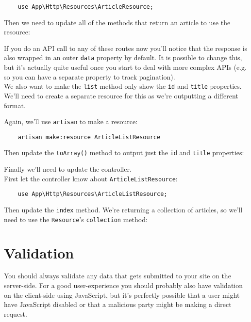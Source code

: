 \begin{verbatim}
    use App\Http\Resources\ArticleResource;
\end{verbatim}

Then we need to update all of the methods that return an article to use the resource:


If you do an API call to any of these routes now you'll notice that the response is also wrapped in an outer \texttt{data} property by default. It is possible to change this, but it's actually quite useful once you start to deal with more complex APIs (e.g. so you can have a separate property to track pagination).
\\

We also want to make the \texttt{list} method only show the \texttt{id} and \texttt{title} properties. We'll need to create a separate resource for this as we're outputting a different format.

\pagebreak

Again, we'll use \texttt{artisan} to make a resource:

\begin{verbatim}
    artisan make:resource ArticleListResource
\end{verbatim}

Then update the \texttt{toArray()} method to output just the \texttt{id} and \texttt{title} properties:


Finally we'll need to update the controller.
\\

First let the controller know about \texttt{ArticleListResource}:

\begin{verbatim}
    use App\Http\Resources\ArticleListResource;
\end{verbatim}

Then update the \texttt{index} method. We're returning a collection of articles, so we'll need to use the \texttt{Resource}'s \texttt{collection} method:



\section{Validation}

You should always validate any data that gets submitted to your site on the server-side. For a good user-experience you should probably also have validation on the client-side using JavaScript, but it's perfectly possible that a user might have JavaScript disabled or that a malicious party might be making a direct request.
\\

